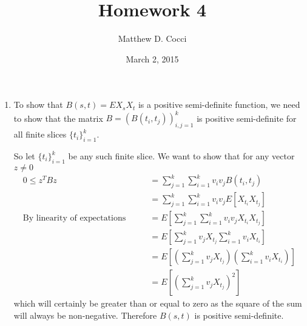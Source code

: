 \documentclass[12pt]{article}
\author{Matthew D. Cocci}
\title{Homework 4}
\date{March 2, 2015}
\theoremstyle{plain}
\theoremstyle{definition}
\theoremstyle{remark}
\begin{document}
\maketitle


\begin{enumerate}
  \item %
    To show that $B(s,t)=EX_sX_t$ is a positive semi-definite function,
    we need to show that the matrix $B =
    \left(B(t_i,t_j)\right)_{i,j=1}^k$ is positive semi-definite for all
    finite slices $\{t_i\}_{i=1}^k$.

    So let $\{t_i\}_{i=1}^k$ be any such finite slice. We want to show
    that for any vector $z\neq 0$
    \begin{align*}
      0 \leq z^T B z
      &= \sum^k_{j=1} \sum^k_{i=1} v_i v_j B(t_i,t_j)\\
      &= \sum^k_{j=1} \sum^k_{i=1} v_i v_j E[X_{t_i}X_{t_j}]\\
      \text{By linearity of expectations} \qquad
      &= E\left[\sum^k_{j=1} \sum^k_{i=1} v_i v_j X_{t_i}X_{t_j}\right]\\
      &= E\left[\sum^k_{j=1} v_j X_{t_j} \sum^k_{i=1} v_i
          X_{t_i}\right]\\
      &= E\left[\left(\sum^k_{j=1} v_j X_{t_j}\right)
          \left( \sum^k_{i=1} v_i X_{t_i}\right)\right]\\
      &= E\left[\left(\sum^k_{j=1} v_j X_{t_j}\right)^2 \right]
    \end{align*}
    which will certainly be greater than or equal to zero as the square
    of the sum will always be non-negative. Therefore $B(s,t)$ is
    positive semi-definite.


\end{enumerate}
\end{document}
